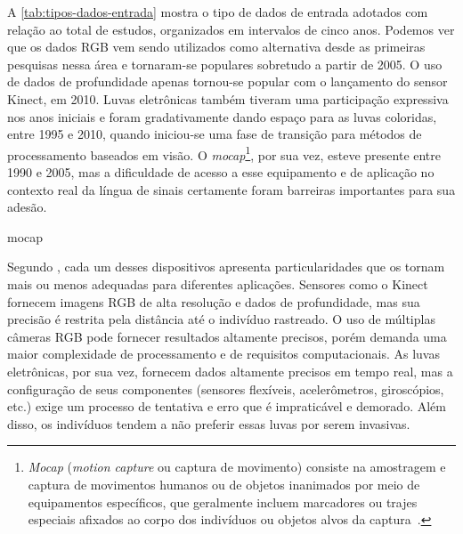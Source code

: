 A \autoref{tab:tipos-dados-entrada} mostra o tipo de dados de entrada adotados com relação ao total de estudos, organizados em intervalos de cinco anos. Podemos ver que os dados RGB vem sendo utilizados como alternativa desde as primeiras pesquisas nessa área e tornaram-se populares sobretudo a partir de 2005. O uso de dados de profundidade apenas tornou-se popular com o lançamento do sensor Kinect, em 2010. Luvas eletrônicas também tiveram uma participação expressiva nos anos iniciais e foram gradativamente dando espaço para as luvas coloridas, entre 1995 e 2010, quando iniciou-se uma fase de transição para métodos de processamento baseados em visão. O \textit{mocap}\footnote{
    \textit{Mocap} (\textit{motion capture} ou captura de movimento) consiste na amostragem e captura de movimentos humanos ou de objetos inanimados por meio de equipamentos específicos, que geralmente incluem marcadores ou trajes especiais afixados ao corpo dos indivíduos ou objetos alvos da captura~\cite{kitagawa-2017-mocap}.
}, por sua vez, esteve presente entre 1990 e 2005, mas a dificuldade de acesso a esse equipamento e de aplicação no contexto real da língua de sinais certamente foram barreiras importantes para sua adesão.

\gls{mocap}



Segundo , cada um desses dispositivos apresenta particularidades que os tornam mais ou menos adequadas para diferentes aplicações. Sensores como o Kinect fornecem imagens RGB de alta resolução e dados de profundidade, mas sua precisão é restrita pela distância até o indivíduo rastreado. O uso de múltiplas câmeras RGB pode fornecer resultados altamente precisos, porém demanda uma maior complexidade de processamento e de requisitos computacionais. As luvas eletrônicas, por sua vez, fornecem dados altamente precisos em tempo real, mas a configuração de seus componentes (sensores flexíveis, acelerômetros, giroscópios, etc.) exige um processo de tentativa e erro que é impraticável e demorado. Além disso, os indivíduos tendem a não preferir essas luvas por serem invasivas.




